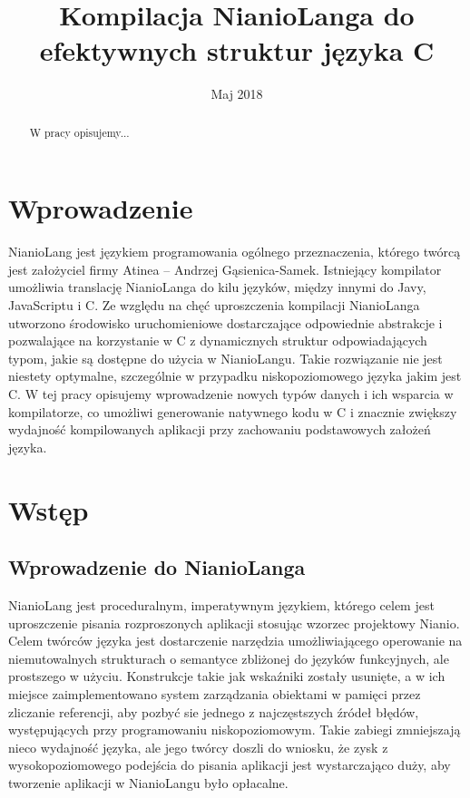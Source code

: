 \documentclass[licencjacka]{pracamgr}
\title{Kompilacja NianioLanga do efektywnych struktur języka C}
\date{Maj 2018}
\begin{document}
\maketitle

\begin{abstract}
W pracy opisujemy...
\end{abstract}

\tableofcontents

\chapter*{Wprowadzenie}
  NianioLang jest językiem programowania ogólnego przeznaczenia, którego twórcą jest
  założyciel firmy Atinea -- Andrzej Gąsienica-Samek.
  Istniejący kompilator umożliwia translację NianioLanga do kilu języków,
  między innymi do Javy, JavaScriptu i C.
  Ze względu na chęć uproszczenia kompilacji NianioLanga
  utworzono środowisko uruchomieniowe dostarczające odpowiednie abstrakcje
  i pozwalające na korzystanie w C z dynamicznych struktur odpowiadających typom,
  jakie są dostępne do użycia w NianioLangu. Takie rozwiązanie nie jest
  niestety optymalne, szczególnie w przypadku niskopoziomowego języka jakim
  jest C. W tej pracy opisujemy wprowadzenie nowych typów danych i ich wsparcia
  w kompilatorze, co umożliwi generowanie natywnego kodu w C i znacznie
  zwiększy wydajność kompilowanych aplikacji przy zachowaniu podstawowych założeń języka.
\chapter{Wstęp}
\section{Wprowadzenie do NianioLanga}
NianioLang jest proceduralnym, imperatywnym językiem, którego celem jest uproszczenie pisania rozproszonych aplikacji stosując wzorzec projektowy
Nianio\cite{wzorzec_nianio}.
Celem twórców języka jest dostarczenie narzędzia umożliwiającego operowanie na niemutowalnych strukturach
o semantyce zbliżonej do języków funkcyjnych, ale prostszego w użyciu.
Konstrukcje takie jak wskaźniki zostały usunięte, a w ich miejsce zaimplementowano system zarządzania obiektami
w pamięci przez zliczanie referencji, aby pozbyć sie jednego z najczęstszych źródeł błędów, występujących przy programowaniu niskopoziomowym.
Takie zabiegi zmniejszają nieco wydajność języka, ale jego twórcy doszli do wniosku, że zysk z wysokopoziomowego podejścia
do pisania aplikacji jest wystarczająco duży, aby tworzenie aplikacji w NianioLangu było opłacalne.
\end{document}
